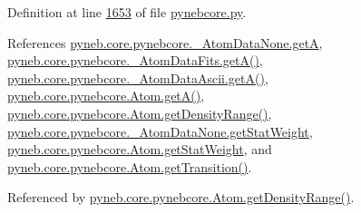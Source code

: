 Definition at line \hyperlink{pynebcore_8py_source_l01653}{1653} of file \hyperlink{pynebcore_8py_source}{pynebcore.\+py}.



References \hyperlink{pynebcore_8py_source_l00060}{pyneb.\+core.\+pynebcore.\+\_\+\+Atom\+Data\+None.\+get\+A}, \hyperlink{pynebcore_8py_source_l00205}{pyneb.\+core.\+pynebcore.\+\_\+\+Atom\+Data\+Fits.\+get\+A()}, \hyperlink{pynebcore_8py_source_l00475}{pyneb.\+core.\+pynebcore.\+\_\+\+Atom\+Data\+Ascii.\+get\+A()}, \hyperlink{pynebcore_8py_source_l01471}{pyneb.\+core.\+pynebcore.\+Atom.\+get\+A()}, \hyperlink{pynebcore_8py_source_l01676}{pyneb.\+core.\+pynebcore.\+Atom.\+get\+Density\+Range()}, \hyperlink{pynebcore_8py_source_l00058}{pyneb.\+core.\+pynebcore.\+\_\+\+Atom\+Data\+None.\+get\+Stat\+Weight}, \hyperlink{pynebcore_8py_source_l01199}{pyneb.\+core.\+pynebcore.\+Atom.\+get\+Stat\+Weight}, and \hyperlink{pynebcore_8py_source_l01406}{pyneb.\+core.\+pynebcore.\+Atom.\+get\+Transition()}.



Referenced by \hyperlink{pynebcore_8py_source_l01676}{pyneb.\+core.\+pynebcore.\+Atom.\+get\+Density\+Range()}.


